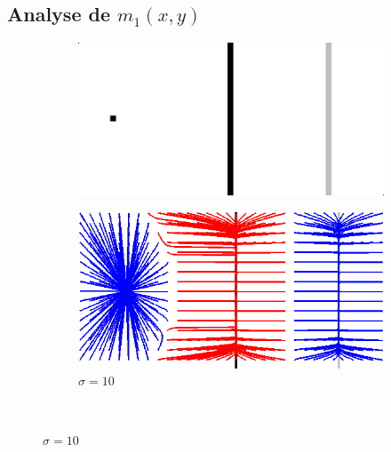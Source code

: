 \subsection{Analyse de $m_1(x,y)$}
\begin{figure}[!h]
   \begin{subfigure}[c]{.5\linewidth}
     \centering
     \includegraphics[width=\textwidth]{Chapters/Images/synthetic_map.png}
     \caption{}
   \end{subfigure} 
      \begin{subfigure}[c]{.5\linewidth}
     \centering
     \includegraphics[width=\textwidth]{Chapters/Images/m2_sigma_10.png}
     \caption{$\sigma=10$}
   \end{subfigure} \\
   

\end{figure}
